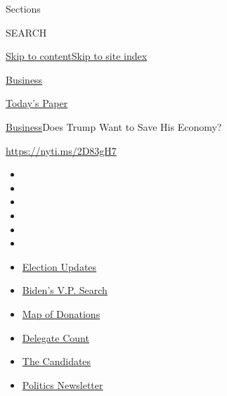 Sections

SEARCH

\protect\hyperlink{site-content}{Skip to
content}\protect\hyperlink{site-index}{Skip to site index}

\href{https://www.nytimes.com/section/business}{Business}

\href{https://myaccount.nytimes.com/auth/login?response_type=cookie\&client_id=vi}{}

\href{https://www.nytimes.com/section/todayspaper}{Today's Paper}

\href{/section/business}{Business}\textbar{}Does Trump Want to Save His
Economy?

\url{https://nyti.ms/2D83gH7}

\begin{itemize}
\item
\item
\item
\item
\item
\item
\end{itemize}

\begin{itemize}
\item
  \href{https://www.nytimes.com/2020/08/03/us/elections/biden-vs-trump.html?action=click\&pgtype=Article\&state=default\&region=TOP_BANNER\&context=storylines_menu}{Election
  Updates}
\item
  \href{https://www.nytimes.com/article/biden-vice-president-2020.html?action=click\&pgtype=Article\&state=default\&region=TOP_BANNER\&context=storylines_menu}{Biden's
  V.P. Search}
\item
  \href{https://www.nytimes.com/interactive/2020/07/24/us/politics/trump-biden-campaign-donors.html?action=click\&pgtype=Article\&state=default\&region=TOP_BANNER\&context=storylines_menu}{Map
  of Donations}
\item
  \href{https://www.nytimes.com/interactive/2020/us/elections/delegate-count-primary-results.html?action=click\&pgtype=Article\&state=default\&region=TOP_BANNER\&context=storylines_menu}{Delegate
  Count}
\item
  \href{https://www.nytimes.com/interactive/2019/us/politics/2020-presidential-candidates.html?action=click\&pgtype=Article\&state=default\&region=TOP_BANNER\&context=storylines_menu}{The
  Candidates}
\item
  \href{https://www.nytimes.com/newsletters/politics?action=click\&pgtype=Article\&state=default\&region=TOP_BANNER\&context=storylines_menu}{Politics
  Newsletter}
\end{itemize}

